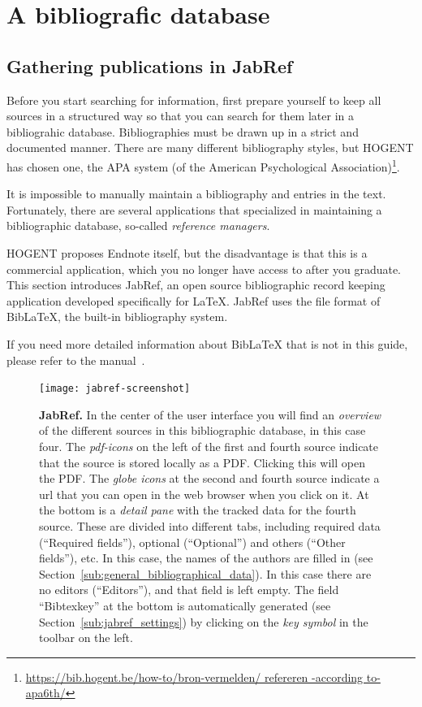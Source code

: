 \chapter{A bibliografic database}
\label{ch:bibliografie}

\section{Gathering publications in JabRef}
\label{sec:publicationsjabref}

Before you start searching for information, first prepare yourself to keep all sources in a structured way so that you can search for them later in a bibliograhic database. Bibliographies must be drawn up in a strict and documented manner. There are many different bibliography styles, but HOGENT has chosen one, the APA system (of the American Psychological Association)\footnote{\url{https://bib.hogent.be/how-to/bron-vermelden/ refereren -according to-apa6th/}}.

It is impossible to manually maintain a bibliography and entries in the text. Fortunately, there are several applications that specialized in maintaining a bibliographic database, so-called \emph{reference managers}.

HOGENT proposes Endnote itself, but the disadvantage is that this is a commercial application, which you no longer have access to after you graduate. This section introduces JabRef, an open source bibliographic record keeping application developed specifically for {\LaTeX}. JabRef uses the file format of Bib{\LaTeX}, the built-in bibliography system.

If you need more detailed information about Bib{\LaTeX} that is not in this guide, please refer to the manual~\autocite{LehmanEtAl2016}.

\begin{figure}
  \centering
  \texttt{[image: jabref-screenshot]}
  \caption[JabRef]{\textbf{JabRef.} In the center of the user interface you will find an \emph{overview} of the different sources in this bibliographic database, in this case four. The \emph{pdf-icons} on the left of the first and fourth source indicate that the source is stored locally as a PDF. Clicking this will open the PDF. The \emph{globe icons} at the second and fourth source indicate a url that you can open in the web browser when you click on it. At the bottom is a \emph{detail pane} with the tracked data for the fourth source. These are divided into different tabs, including required data (``Required fields''), optional (``Optional'') and others (``Other fields''), etc. In this case, the names of the authors are filled in (see Section~\ref{sub:general_bibliographical_data}). In this case there are no editors (``Editors''), and that field is left empty. The field ``Bibtexkey'' at the bottom is automatically generated (see Section~\ref{sub:jabref_settings}) by clicking on the \emph{key symbol} in the toolbar on the left.} 
  \label{fig:jabref}
\end{figure}


